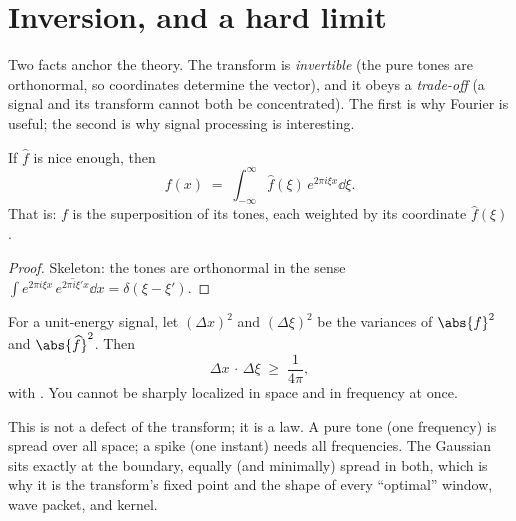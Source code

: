 \section{Inversion, and a hard limit}\label{sec:why}
\quad{}

\begin{strand}
Two facts anchor the theory. The transform is \emph{invertible} (the pure tones are orthonormal,
so coordinates determine the vector), and it obeys a \emph{trade-off} (a signal and its transform
cannot both be concentrated). The first is why Fourier is useful; the second is why signal
processing is interesting.
\end{strand}


\begin{theorem}[inversion]\label{thm:inv}
If $\widehat f$ is nice enough, then
\[
  f(x)\;=\;\int_{-\infty}^{\infty}\widehat f(\xi)\,e^{2\pi i\xi x}\dd\xi .
\]
That is: $f$ is the superposition of its tones, each weighted by its coordinate $\widehat f(\xi)$.
\end{theorem}
\begin{proof}
Skeleton: the tones are orthonormal in the sense $\int e^{2\pi i\xi x}\,\overline{e^{2\pi i\xi' x}}\dd x
=\delta(\xi-\xi')$. 
\end{proof}



\begin{theorem}\label{thm:unc}
For a unit-energy signal, let $(\Delta x)^2$ and $(\Delta\xi)^2$ be the variances of $\abs{f}^2$ and
$\abs{\widehat f}^2$. Then
\[
  \Delta x\,\cdot\,\Delta\xi\;\ge\;\frac{1}{4\pi},
\]
with . You cannot be sharply localized in space and in
frequency at once.
\end{theorem}

\begin{strand}
This is not a defect of the transform; it is a law. A pure tone (one frequency) is spread over all
space; a spike (one instant) needs all frequencies. The Gaussian sits exactly at the boundary,
equally (and minimally) spread in both, which is why it is the transform's fixed point and the
shape of every ``optimal'' window, wave packet, and kernel.
\end{strand}

